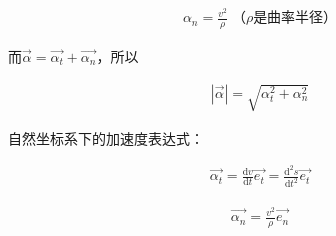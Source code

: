 \documentclass[
	12pt, %
	fleqn, %
	a4paper, %
]{myLegrandOrangeBook}
\newcommand{\rmd}{\mathrm{d}}
\newcommand{\deriv}[2]{\frac{\rmd #1}{\rmd #2}}
\begin{document}
    \begin{align}
        \alpha_n = \frac{v^2}{\rho}\; \text{（\(\rho\)是曲率半径）}
    \end{align}

    而\(\overrightarrow{\alpha} = \overrightarrow{\alpha_t} + \overrightarrow{\alpha_n}\)，所以

    \begin{align}
        \left|\overrightarrow{\alpha}\right| = \sqrt{\alpha_t^2 + \alpha_n^2}
    \end{align}

    自然坐标系下的加速度表达式：
    
    \begin{align}
        \overrightarrow{\alpha_t} = \deriv{v}{t} \overrightarrow{e_t} =
        \frac{\rmd^2 s}{\rmd t^2} \overrightarrow{e_t}
    \end{align}

    \begin{align}
        \overrightarrow{\alpha_n} = \frac{v^2}{\rho} \overrightarrow{e_n}
    \end{align}



\end{document}
